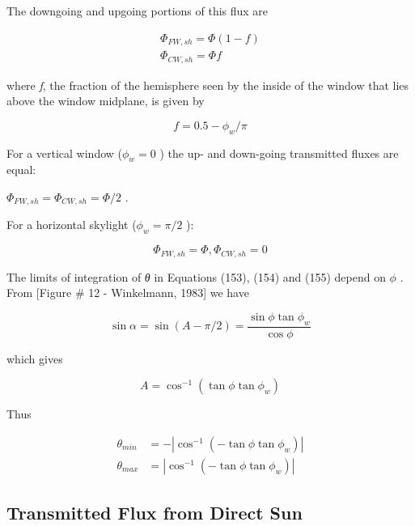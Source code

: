 The downgoing and upgoing portions of this flux are

\begin{equation}
\begin{array}{l}
    \Phi_{FW,sh} = \Phi (1 - f) \\
    \Phi_{CW,sh} = \Phi f
\end{array}
\end{equation}

where \emph{f}, the fraction of the hemisphere seen by the inside of the window that lies above the window midplane, is given by

\begin{equation}
f = 0.5 - {\phi_w}/\pi
\end{equation}

For a vertical window (\({\phi_w} = 0\) ) the up- and down-going transmitted fluxes are equal:

\({\Phi_{FW,sh}} = {\Phi_{CW,sh}} = \Phi /2\) .

For a horizontal skylight (\({\phi_w} = \pi /2\) ):

\begin{equation}
{\Phi_{FW,sh}} = \Phi ,{\Phi_{CW,sh}} = 0
\end{equation}

The limits of integration of \emph{θ} in Equations (153), (154) and (155) depend on \(\phi\) . From {[}Figure \# 12 - Winkelmann, 1983{]} we have

\begin{equation}
\sin \alpha  = \sin (A - \pi /2) = \frac{{\sin \phi \tan {\phi_w}}}{{\cos \phi }}
\end{equation}

which gives

\begin{equation}
A = {\cos ^{ - 1}}(\tan \phi \tan {\phi_w})
\end{equation}

Thus

\begin{equation}
\begin{array}{rl}
    \theta_{min} & =  - \left| \cos^{-1}(-\tan\phi\tan\phi_w) \right| \\
    \theta_{max} & = \left| \cos^{-1}(-\tan\phi\tan\phi_w) \right| 
\end{array}
\end{equation}

\subsection{Transmitted Flux from Direct Sun}\label{transmitted-flux-from-direct-sun}

